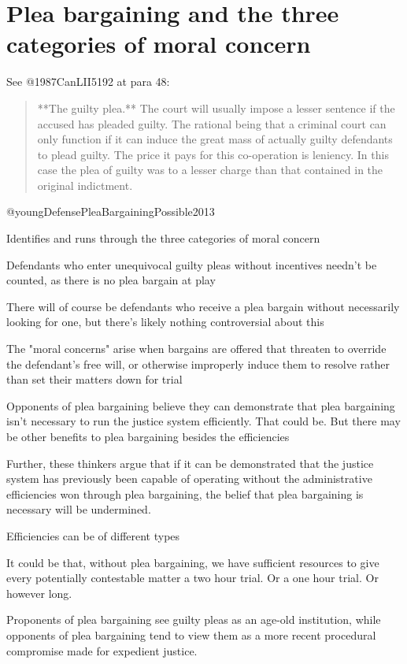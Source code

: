 \section{Plea bargaining and the three categories of moral concern}

See @1987CanLII5192 at para 48:
\begin{quote}
    **The guilty plea.** The court will usually impose a lesser sentence if the accused has pleaded guilty. The rational being that a criminal court can only function if it can induce the great mass of actually guilty defendants to plead guilty. The price it pays for this co-operation is leniency. In this case the plea of guilty was to a lesser charge than that contained in the original indictment.
\end{quote}

@youngDefensePleaBargainingPossible2013

Identifies and runs through the three categories of moral concern

Defendants who enter unequivocal guilty pleas without incentives needn't be counted, as there is no plea bargain at play

There will of course be defendants who receive a plea bargain without necessarily looking for one, but there's likely nothing controversial about this

The "moral concerns" arise when bargains are offered that threaten to override the defendant's free will, or otherwise improperly induce them to resolve rather than set their matters down for trial

Opponents of plea bargaining believe they can demonstrate that plea bargaining isn't necessary to run the justice system efficiently. That could be. But there may be other benefits to plea bargaining besides the efficiencies

Further, these thinkers argue that if it can be demonstrated that the justice system has previously been capable of operating without the administrative efficiencies won through plea bargaining, the belief that plea bargaining is necessary will be undermined.

Efficiencies can be of different types

It could be that, without plea bargaining, we have sufficient resources to give every potentially contestable matter a two hour trial. Or a one hour trial. Or however long.

Proponents of plea bargaining see guilty pleas as an age-old institution, while opponents of plea bargaining tend to view them as a more recent procedural compromise made for expedient justice.

